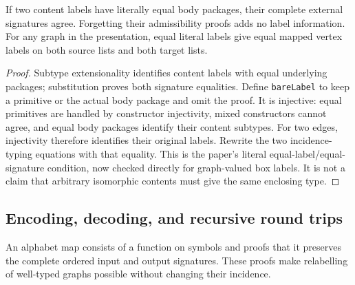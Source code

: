 




\begin{lemma}
If two content labels have literally equal body packages, their complete external
signatures agree. Forgetting their admissibility proofs adds no label information.
For any graph in the presentation, equal literal labels give equal mapped vertex
labels on both source lists and both target lists.
\end{lemma}
\begin{proof}
Subtype extensionality identifies content labels with equal underlying packages;
substitution proves both signature equalities. Define \texttt{bareLabel} to keep
a primitive or the actual body package and omit the proof. It is injective:
equal primitives are handled by constructor injectivity, mixed constructors
cannot agree, and equal body packages identify their content subtypes.
For two edges, injectivity therefore identifies their original labels.
Rewrite the two incidence-typing equations with that equality. This is the
paper's literal equal-label/equal-signature condition, now checked directly for
graph-valued box labels. It is not a claim that arbitrary isomorphic contents
must give the same enclosing type.
\end{proof}



\subsection{Encoding, decoding, and recursive round trips}
\begin{definition}
An alphabet map consists of a function on symbols and proofs that it preserves
the complete ordered input and output signatures. These proofs make relabelling
of well-typed graphs possible without changing their incidence.
\end{definition}

